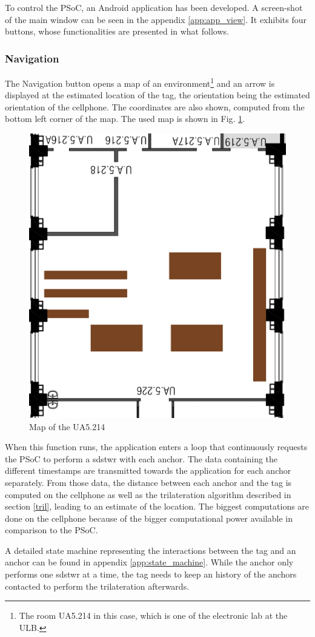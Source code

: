 To control the PSoC, an Android application has been developed. A screen-shot of the main window can be seen in the appendix \ref{app:app_view}. It exhibits four buttons, whose functionalities are presented in what follows.

\subsubsection{Navigation}

The Navigation button opens a map of an environment\footnote{The room UA5.214 in this case, which is one of the electronic lab at the ULB.} and an arrow is displayed at the estimated location of the tag, the orientation being the estimated orientation of the cellphone. The coordinates are also shown, computed from the bottom left corner of the map. The used map is shown in Fig. \ref{fig:ua5_map}.

\begin{figure}[H]
	\centering
	\includegraphics[width=.4\linewidth]{Images/little_room.png}
	\caption{Map of the UA5.214}
	\label{fig:ua5_map}
\end{figure}

When this function runs, the application enters a loop that continuously requests the PSoC to perform a \gls{sdstwr} with each anchor. The data containing the different timestamps are transmitted towards the application for each anchor separately. From those data, the distance between each anchor and the tag is computed on the cellphone as well as the trilateration algorithm described in section \ref{tril}, leading to an estimate of the location. The biggest computations are done on the cellphone because of the bigger computational power available in comparison to the PSoC.
\vspace{2mm}

A detailed state machine representing the interactions between the tag and an anchor can be found in appendix \ref{app:state_machine}. While the anchor only performs one \gls{sdstwr} at a time, the tag needs to keep an history of the anchors contacted to perform the trilateration afterwards.

